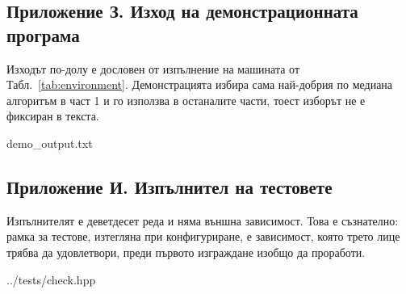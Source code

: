 \subsection*{Приложение З. Изход на демонстрационната програма}

Изходът по-долу е дословен от изпълнение на машината от Табл.~\ref{tab:environment}.
Демонстрацията избира сама най-добрия по медиана алгоритъм в част 1 и го използва в
останалите части, тоест изборът не е фиксиран в текста.

%
{demo_output.txt}

\subsection*{Приложение И. Изпълнител на тестовете}

Изпълнителят е деветдесет реда и няма външна зависимост. Това е съзнателно: рамка за
тестове, изтегляна при конфигуриране, е зависимост, която трето лице трябва да
удовлетвори, преди първото изграждане изобщо да проработи.

%
{../tests/check.hpp}
